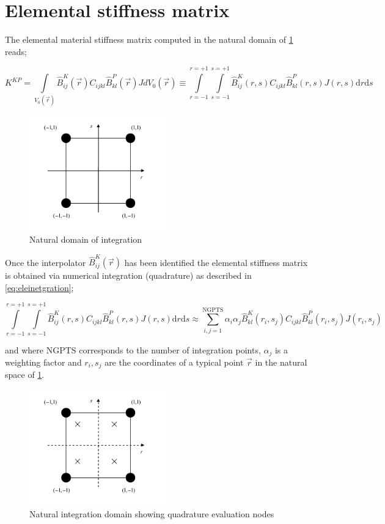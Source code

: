 \section*{Elemental stiffness matrix}
The elemental material stiffness matrix computed in the natural domain of \cref{fig:Nat domain} reads;

\begin{equation}
K^{KP}=\int\limits_{V_0(\vec{r})} \hat{B}_{ij}^K(\vec{r}) C_{ijkl} \hat{B}_{kl}^P(\vec{r})J dV_0(\vec{r})\equiv \int\limits_{r=-1}^{r=+1}\int\limits_{s=-1}^{s=+1} \hat{B}_{ij}^K(r,s) C_{ijkl} \hat{B}_{kl}^P(r,s)J(r,s) \mathrm{d}r\mathrm{d}s
\label{eq:elematrix}
\end{equation}



\begin{figure}[h]
\centering
\includegraphics[width=6cm]{img/figure3.pdf}
\caption{Natural domain of integration}
\label{fig:Nat domain}
\end{figure}	 		
 

Once the interpolator $\hat{B}_{ij}^K(\vec{r})$ has been identified the elemental stiffness matrix is obtained via numerical integration (quadrature) as described in \eqref{eq:eleinetgration};

\begin{equation}
\int\limits_{r=-1}^{r=+1}\int\limits_{s=-1}^{s=+1} \hat{B}_{ij}^K(r,s) C_{ijkl} \hat{B}_{kl}^P(r,s)J(r,s) \mathrm{d}r\mathrm{d}s\approx \sum_{i,j=1}^\text{NGPTS} \alpha_i \alpha_j \hat{B}_{kl}^K(r_i,s_j)C_{ijkl} \hat{B}_{kl}^P(r_i,s_j) J(r_i,s_j)
\label{eq:eleintegration}
\end{equation}

	 											
and where NGPTS corresponds to the number of integration points, $\alpha_j$ is a weighting factor and $r_i,s_j$   are the coordinates of a typical point $\vec{r}$ in the natural space of \cref{fig:Nat domain}.

 
\begin{figure}[h]
\centering
\includegraphics[width=6cm]{img/figure4.pdf}
\caption{Natural integration domain showing quadrature evaluation nodes}
\label{fig:integration domain}
\end{figure}	 


